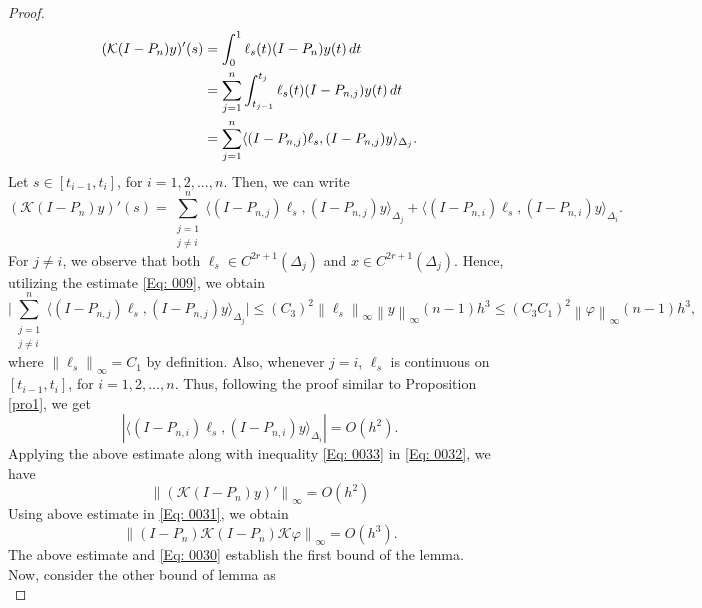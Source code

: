 \documentclass[pdflatex, sn-mathphys-num]{sn-jnl}%
\newcommand{\norm}[1]{\left\lVert #1\right\rVert}
\theoremstyle{thmstyleone}%
\theoremstyle{thmstyletwo}%
\theoremstyle{thmstylethree}%
\begin{document}
\begin{proof}
\begin{align*}
		(\mathcal{K}(I - P_n)y)'(s) &= \int_{0}^{1} \ell_s(t) (I - P_n) y(t) \, dt \notag \\
		&= \sum_{j=1}^{n} \int_{t_{j-1}}^{t_j} \ell_s(t) (I - P_{n,j}) y(t) \, dt \notag \\
		&= \sum_{j=1}^{n} \langle (I - P_{n,j}) \ell_s, (I - P_{n,j}) y \rangle_{\Delta_j}.
	\end{align*}
	Let \( s \in [t_{i-1}, t_i]\), for \(i=1,2,\ldots,n\). Then, we can write
	\begin{equation} \label{Eq: 0032}
		(\mathcal{K}(I - P_n)y)'(s) = \sum_{\substack{j=1 \\  j\ne i} }^{n} \langle (I - P_{n,j}) \ell_s, (I - P_{n,j}) y \rangle_{\Delta_j} + \langle (I - P_{n,i}) \ell_s, (I - P_{n,i}) y \rangle_{\Delta_i}.
	\end{equation}
	For \( j \neq i \), we observe that both \( \ell_s \in C^{2r+1}(\Delta_j) \) and \( x \in C^{2r+1}(\Delta_j)\). Hence, utilizing the estimate \eqref{Eq: 009}, we obtain  
	\begin{equation} \label{Eq: 0033}  
		\bigg|\sum_{\substack{j=1 \\ j\ne i} }^{n} \langle (I - P_{n,j}) \ell_s, (I - P_{n,j}) y \rangle_{\Delta_j} \bigg| \leq (C_3)^2 \norm{\ell_s}_\infty \norm{y}_\infty (n-1) h^{3} \leq  (C_3 C_1)^2 \norm{\varphi}_\infty (n-1) h^{3},
	\end{equation}  
	where \(\norm{\ell_s}_\infty = C_1\) by definition. Also, whenever \(j = i\), \(\ell_s\) is continuous on \( [t_{i-1}, t_i]\), for \(i=1,2,\ldots,n\). Thus, following the proof similar to Proposition \ref{pro1}, we get
	\begin{equation*}
		|\langle (I - P_{n,i}) \ell_s, (I - P_{n,i}) y \rangle_{\Delta_i}| = O\left(h^{2} \right).
	\end{equation*}
	Applying the above estimate along with inequality \eqref{Eq: 0033} in \eqref{Eq: 0032}, we have
	\begin{equation*}
		\norm{	(\mathcal{K}(I - P_n)y)'}_\infty = O\left(h^{2} \right)
	\end{equation*}
	Using above estimate in \eqref{Eq: 0031}, we obtain
	\begin{equation*}
		\norm{(I - P_n) \mathcal{K}(I - P_n)\mathcal{K}\varphi}_\infty = O\left(h^{3} \right).
	\end{equation*}
	The above estimate and \eqref{Eq: 0030} establish the first bound of the lemma.\\
	Now, consider the other bound of lemma as
	\begin{equation*}

\end{equation*}
\end{proof}
\end{document}
